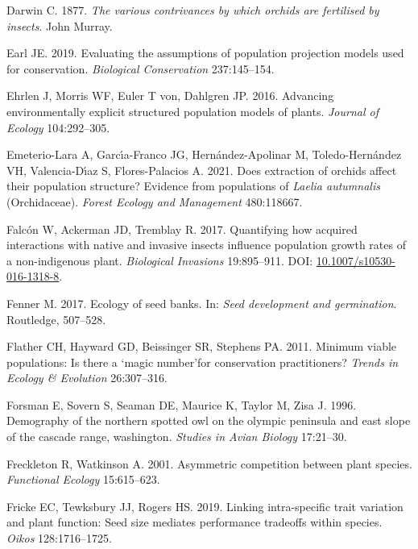 \documentclass[
  12pt,
  letterpaper,
]{book}
\newlength{\cslhangindent}
\newenvironment{CSLReferences}[2] %
 {\begin{list}{}{%
  \setlength{\itemindent}{0pt}
  \setlength{\leftmargin}{0pt}
  \setlength{\parsep}{0pt}
  \ifodd #1
   \setlength{\leftmargin}{\cslhangindent}
   \setlength{\itemindent}{-1\cslhangindent}
  \fi
  \setlength{\itemsep}{#2\baselineskip}}}
 {\end{list}}
\begin{document}
\begin{CSLReferences}{1}{0}
Darwin C. 1877. \emph{The various contrivances by which orchids are
fertilised by insects}. John Murray.

Earl JE. 2019. Evaluating the assumptions of population projection
models used for conservation. \emph{Biological Conservation}
237:145--154.

Ehrlen J, Morris WF, Euler T von, Dahlgren JP. 2016. Advancing
environmentally explicit structured population models of plants.
\emph{Journal of Ecology} 104:292--305.

Emeterio-Lara A, Garcı́a-Franco JG, Hernández-Apolinar M,
Toledo-Hernández VH, Valencia-Dı́az S, Flores-Palacios A. 2021. Does
extraction of orchids affect their population structure? Evidence from
populations of \emph{{L}aelia {a}utumnalis} ({O}rchidaceae).
\emph{Forest Ecology and Management} 480:118667.

Falcón W, Ackerman JD, Tremblay R. 2017. Quantifying how acquired
interactions with native and invasive insects influence population
growth rates of a non-indigenous plant. \emph{Biological Invasions}
19:895--911. DOI:
\href{https://doi.org/10.1007/s10530-016-1318-8}{10.1007/s10530-016-1318-8}.

Fenner M. 2017. Ecology of seed banks. In: \emph{Seed development and
germination}. Routledge, 507--528.

Flather CH, Hayward GD, Beissinger SR, Stephens PA. 2011. Minimum viable
populations: Is there a `magic number'for conservation practitioners?
\emph{Trends in Ecology \& Evolution} 26:307--316.

Forsman E, Sovern S, Seaman DE, Maurice K, Taylor M, Zisa J. 1996.
Demography of the northern spotted owl on the olympic peninsula and east
slope of the cascade range, washington. \emph{Studies in Avian Biology}
17:21--30.

Freckleton R, Watkinson A. 2001. Asymmetric competition between plant
species. \emph{Functional Ecology} 15:615--623.

Fricke EC, Tewksbury JJ, Rogers HS. 2019. Linking intra-specific trait
variation and plant function: Seed size mediates performance tradeoffs
within species. \emph{Oikos} 128:1716--1725.


\end{CSLReferences}
\end{document}
